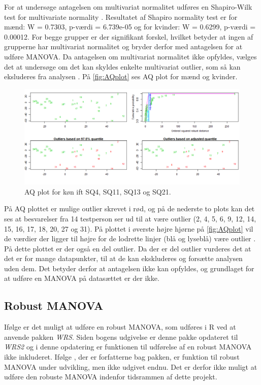 For at undersøge antagelsen om multivariat normalitet udføres en Shapiro-Wilk test for multivariate normality \parencite[s. 726]{FieldMANOVA}. \blankline
%
Resultatet af Shapiro normality test er for mænd: W = 0.7303, p-værdi = 6.739e-05 og for kvinder: W = 0.6299, p-værdi = 0.00012. For begge grupper er der signifikant forskel, hvilket betyder at ingen af grupperne har multivariat normalitet og bryder derfor med antagelsen for at udføre MANOVA. \blankline
%
Da antagelsen om multivariat normalitet ikke opfyldes, vælges det at undersøge om det kan skyldes enkelte multivariat outlier, som så kan eksluderes fra analysen \parencite[s. 727]{FieldMANOVA}. På \autoref{fig:AQplot} ses AQ plot for mænd og kvinder.  
%
\begin{figure}[H]
\centering
\includegraphics[width = \textwidth]{Figure/DatabehandlingSkalaer/AQplot} 
\caption{AQ plot for køn ift SQ4, SQ11, SQ13 og SQ21.}
\label{fig:AQplot}
\end{figure}
\noindent
%
På AQ plottet er mulige outlier skrevet i rød, og på de nederste to plots kan det ses at besvarelser fra 14 testperson ser ud til at være outlier (2, 4, 5, 6, 9, 12, 14, 15, 16, 17, 18, 20, 27 og 31). \blankline
%
På plottet i øverste højre hjørne på \autoref{fig:AQplot} vil de værdier der ligger til højre for de lodrette linjer (blå og lyseblå) være outlier \parencite[s. 727]{FieldMANOVA}. På dette plottet er der også en del outlier. Da der er del outlier vurderes det at det er for mange datapunkter, til at de kan ekskluderes og forsætte analysen uden dem. Det betyder derfor at antagelsen ikke kan opfyldes, og grundlaget for at udføre en MANOVA på datasættet er der ikke. 
%
\subsection{Robust MANOVA}
%
Ifølge \textcite[s. 733]{FieldMANOVA} er det muligt at udføre en robust MANOVA, som udføres i R ved at anvende pakken \textit{WRS}. Siden bogens udgivelse er denne pakke opdateret til \textit{WRS2} og i denne opdatering er funktionen til udførelse af en robust MANOVA ikke inkluderet. Ifølge \textcite[s. 30]{WEB:WRS2}, der er forfatterne bag pakken, er funktion til robust MANOVA under udvikling, men ikke udgivet endnu. Det er derfor ikke muligt at udføre den robuste MANOVA indenfor tidsrammen af dette projekt. 